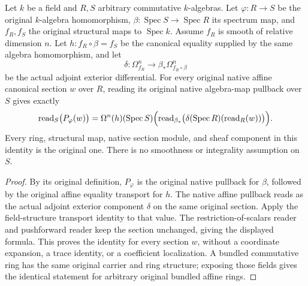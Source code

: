 \begin{theorem}
\label{thm:kn-canonical-affine-native-differential-readback}
\leanok
Let $k$ be a field and $R,S$ arbitrary commutative $k$-algebras. Let
$\varphi:R\to S$ be the original $k$-algebra homomorphism,
$\beta:\operatorname{Spec}S\to\operatorname{Spec}R$ its spectrum map,
and $f_R,f_S$ the original structural maps to $\operatorname{Spec}k$.
Assume $f_R$ is smooth of relative dimension $n$. Let
$h:f_R\circ\beta=f_S$ be the canonical equality supplied by the
same algebra homomorphism, and let
\[
 \delta:\Omega^n_{f_R}\longrightarrow\beta_*\Omega^n_{f_R\circ\beta}
\]
be the actual adjoint exterior differential. For every original native
affine canonical section $w$ over $R$, reading its original native
algebra-map pullback over $S$ gives exactly
\[
 \operatorname{read}_S\bigl(P_\varphi(w)\bigr)
 =\Omega^n(h)(\operatorname{Spec}S)
   \Bigl(\operatorname{read}_{\beta_*}
          \bigl(\delta(\operatorname{Spec}R)(\operatorname{read}_R(w))\bigr)
   \Bigr).
\]
Every ring, structural map, native section module, and sheaf component in
this identity is the original one. There is no smoothness or integrality
assumption on $S$.
\end{theorem}
\begin{proof}
By its original definition, $P_\varphi$ is the original native pullback
for $\beta$, followed by the original affine equality transport for $h$.
The native affine pullback reads as the actual adjoint exterior
component $\delta$ on the same original section. Apply the field-structure
transport identity to that value. The restriction-of-scalars reader and
pushforward reader keep the section unchanged, giving the displayed
formula. This proves the identity for every section $w$, without a
coordinate expansion, a trace identity, or a coefficient localization.
A bundled commutative ring has the same original carrier and ring
structure; exposing those fields gives the identical statement for
arbitrary original bundled affine rings.
\end{proof}
